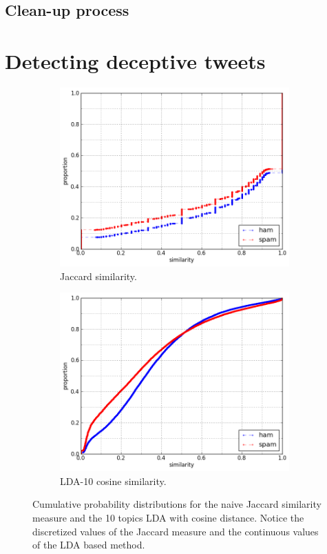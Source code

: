 \documentclass[times, 11pt, twocolumn]{article}
\begin{document}
\subsection{Clean-up process}

\section{Detecting deceptive tweets}

\begin{figure}[ht]\centering
	\begin{subfigure}[c]{8.8cm}
	\includegraphics[width=8.8cm]{jacc_max.png}
	\caption{Jaccard similarity.}
	\end{subfigure}
	\begin{subfigure}[c]{8.8cm}
	\includegraphics[width=8.8cm]{cosine_lda10_max.png}
	\caption{LDA-10 cosine similarity.}
	\end{subfigure}
	\caption{Cumulative probability distributions for the
		naive Jaccard similarity measure and the 10 topics LDA
		with cosine distance. Notice the discretized values of the
		Jaccard measure and the continuous values of the LDA
	based method.}
\end{figure}
\end{document}
